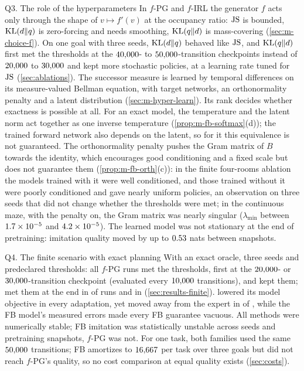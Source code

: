 \begin{answerbox}{Q3. The role of the hyperparameters}
In $f$-PG and $f$-IRL the generator $f$ acts only through the shape of $v\mapsto f'(v)$ at the occupancy ratio: $\JS$ is bounded, $\KL(d\Vert q)$ is zero-forcing and needs smoothing, $\KL(q\Vert d)$ is mass-covering (\cref{sec:m-choice-f}). On one goal with three seeds, $\KL(d\Vert q)$ behaved like $\JS$, and $\KL(q\Vert d)$ first met the thresholds at the $\vn{s09.klqd.first.lo}{40{,}000}$- to $\vn{s09.klqd.first.hi}{50{,}000}$-transition checkpoints instead of $\vn{s09.js_kldq.first.lo}{20{,}000}$ to $\vn{s09.js_kldq.first.hi}{30{,}000}$ and kept more stochastic policies, at a learning rate tuned for $\JS$ (\cref{sec:ablations}).
The successor measure is learned by temporal differences on its measure-valued Bellman equation, with target networks, an orthonormality penalty and a latent distribution (\cref{sec:m-hyper-learn}). Its rank decides whether exactness is possible at all. For an exact model, the temperature and the latent norm act together as one inverse temperature (\cref{prop:m-fb-softmax}(d)); the trained forward network also depends on the latent, so for it this equivalence is not guaranteed. The orthonormality penalty pushes the Gram matrix of $B$ towards the identity, which encourages good conditioning and a fixed scale but does not guarantee them (\cref{prop:m-fb-orth}(c)): in the finite four-rooms ablation the models trained with it were well conditioned, and those trained without it were poorly conditioned and gave nearly uniform policies, an observation on three seeds that did not change whether the thresholds were met; in the continuous maze, with the penalty on, the Gram matrix was nearly singular ($\lambda_{\min}$ between $\vn{s12.lmin.lo}{1.7\times10^{-5}}$ and $\vn{s12.lmin.hi}{4.2\times10^{-5}}$). The learned model was not stationary at the end of pretraining: imitation quality moved by up to $\vn{s11.swing}{0.53}$ nats between snapshots.
\end{answerbox}

\begin{answerbox}{Q4. The finite scenario with exact planning}
With an exact oracle, three seeds and predeclared thresholds: all  $f$-PG runs met the thresholds, first at the $\vn{abs.fpg.first.lo}{20{,}000}$- or $\vn{abs.fpg.first.hi}{30{,}000}$-transition checkpoint (evaluated every $\vn{fpg.interval.f}{10{,}000}$ transitions), and kept them; \ERFB{} met them at the end in  of  runs and \DMFB{} in  (\cref{sec:results-finite}).
\DMFB{} lowered its model objective in every adaptation, yet moved away from the expert in  of , while the FB model's measured errors made every FB guarantee vacuous.
All methods were numerically stable; FB imitation was statistically unstable across seeds and pretraining snapshots, $f$-PG was not.
For one task, both families used the same $\vn{budget.same.f}{50{,}000}$ transitions; FB amortizes to $\vn{s14.amortized.f}{16{,}667}$ per task over three goals but did not reach $f$-PG's quality, so no cost comparison at equal quality exists (\cref{sec:costs}).
\end{answerbox}

